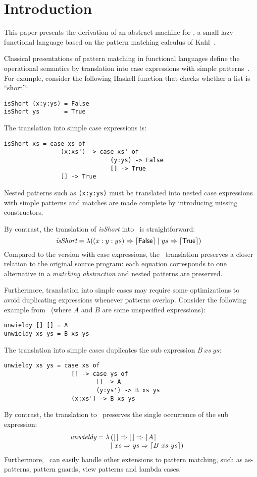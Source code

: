 \section{Introduction}\label{sec:intro}

This paper presents the derivation of an abstract machine for \lambdaPMC, a small
lazy functional language based on the pattern matching calculus
of Kahl~\cite{kahl_2004}.

Classical presentations of pattern matching in functional languages
define the operational semantics by translation
into case expressions with simple patterns~\cite{spj_1987,jones_1992}. For
example, consider the following Haskell function that checks whether a
list is ``short'':
\begin{verbatim}
isShort (x:y:ys) = False
isShort ys       = True
\end{verbatim}
The translation into simple case expressions is:
\begin{verbatim}
isShort xs = case xs of
                (x:xs') -> case xs' of
                              (y:ys) -> False
                              [] -> True
                [] -> True
\end{verbatim}
Nested patterns such as \verb|(x:y:ys)| must be translated into nested
case expressions with simple patterns and matches are made complete by
introducing missing constructors.  

By contrast, the translation of \textit{isShort} into \lambdaPMC\ is
straightforward:
\[ 
  \textit{isShort} = \lambda ((x:y:ys) \Rightarrow \left\lceil \textsf{False}\right\rceil \mid
  ys \Rightarrow \left\lceil \textsf{True}\right\rceil) 
\]
Compared to the version with case expressions, the \lambdaPMC\ translation
preserves a closer relation to the original source program: each
equation corresponds to one alternative in a \emph{matching
  abstraction} and nested patterns are preserved. 

Furthermore, translation into simple cases may require some
optimizations to avoid duplicating expressions whenever patterns
overlap. Consider the following example from~\cite{spj_1987} (where
$A$ and $B$ are some unspecified expressions):
\begin{verbatim}
unwieldy [] [] = A
unwieldy xs ys = B xs ys
\end{verbatim}
The translation into simple cases duplicates the sub expression $B~ xs~ ys$:
\begin{verbatim}
unwieldy xs ys = case xs of
                   [] -> case ys of
                          [] -> A
                          (y:ys') -> B xs ys
                   (x:xs') -> B xs ys
\end{verbatim}
By contrast, the translation to \lambdaPMC\ preserves the single occurrence of
the sub expression:
\[
  \textit{unwieldy} =
  \lambda\!\! \begin{array}[t]{l}
             ([\,] \Rightarrow [\,] \Rightarrow \left\lceil A\right\rceil \\
             \mid xs \Rightarrow ys \Rightarrow \left\lceil B~xs~ys\right\rceil)
             \end{array}
\]
Furthermore, \lambdaPMC\ can easily handle
other extensions to pattern matching, such as as-patterns, 
pattern guards, view patterns and lambda cases.

